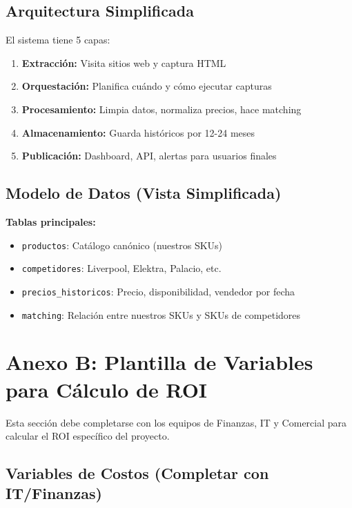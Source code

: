 \documentclass[12pt,a4paper]{article}
\begin{document}
\subsection{Arquitectura Simplificada}

El sistema tiene 5 capas:

\begin{enumerate}[leftmargin=*]
    \item \textbf{Extracción:} Visita sitios web y captura HTML
    \item \textbf{Orquestación:} Planifica cuándo y cómo ejecutar capturas
    \item \textbf{Procesamiento:} Limpia datos, normaliza precios, hace matching
    \item \textbf{Almacenamiento:} Guarda históricos por 12-24 meses
    \item \textbf{Publicación:} Dashboard, API, alertas para usuarios finales
\end{enumerate}

\subsection{Modelo de Datos (Vista Simplificada)}

\textbf{Tablas principales:}
\begin{itemize}[leftmargin=*]
    \item \texttt{productos}: Catálogo canónico (nuestros SKUs)
    \item \texttt{competidores}: Liverpool, Elektra, Palacio, etc.
    \item \texttt{precios\_historicos}: Precio, disponibilidad, vendedor por fecha
    \item \texttt{matching}: Relación entre nuestros SKUs y SKUs de competidores
\end{itemize}

\newpage
\section{Anexo B: Plantilla de Variables para Cálculo de ROI}

Esta sección debe completarse con los equipos de Finanzas, IT y Comercial para calcular el ROI específico del proyecto.

\subsection{Variables de Costos (Completar con IT/Finanzas)}
\end{document}
